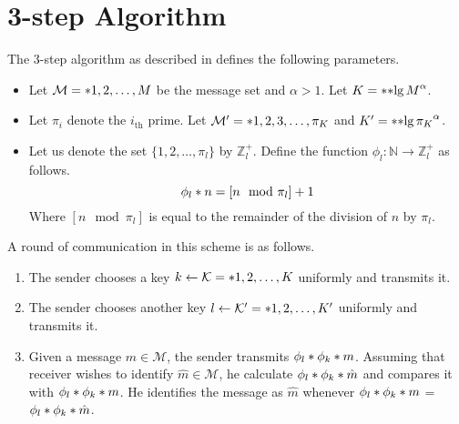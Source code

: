 \section{3-step Algorithm}
The 3-step algorithm as described in \cite{multiway} defines the following parameters.
\begin{itemize}
	\item Let \(\mathcal{M} = \set{1,2, \dots, M }\) be the message set and \(\alpha > 1\). Let \(K = \ceil{\bracket{\lg M}^{\alpha}}\).
	\item Let \(\pi_i\) denote the \(i_{\mathrm{th}}\) prime. Let \(\mathcal{M}' = \set{1, 2, 3 ,\dots, \pi_K}\) and \(K' = \ceil{\bracket{\lg \pi_K}^{\alpha}}\). 
	\item Let us denote the set \(\{1,2, \dots, \pi_l \}\) by \(\mathbb{Z}^+_l\).  Define the function \(\phi_l: \mathbb{N} \to \mathbb{Z}_{l}^+ \) as follows.
	\begin{equation}
		\func{\phi_l}{n} = [n \mod \pi_l] + 1
	\end{equation}
	Where \([n \mod \pi_l]\) is equal to the remainder of the division of \(n\) by \(\pi_l\).
\end{itemize}
A round of communication in this scheme is as follows.
\begin{enumerate}
	\item The sender chooses a key \(k \gets \mathcal{K} = \set{1,2,\dots, K }\) uniformly and transmits it.
	\item The sender chooses another key \(l \gets \mathcal{K}' = \set{1,2,\dots, K' }\) uniformly and transmits it.
	\item Given a message \(m \in \mathcal{M}\), the sender transmits \(\func{\phi_l}{\func{\phi_k}{m}}\). Assuming that receiver wishes to identify \(\hat{m} \in \mathcal{M}\), he calculate \(\func{\phi_l}{\func{\phi_k}{\hat{m}}}\) and compares it with \(\func{\phi_l}{\func{\phi_k}{m}}\). He identifies the message as \(\hat{m}\) whenever \(\func{\phi_l}{\func{\phi_k}{m}}\) = \(\func{\phi_l}{\func{\phi_k}{\hat{m}}}\).
\end{enumerate}

